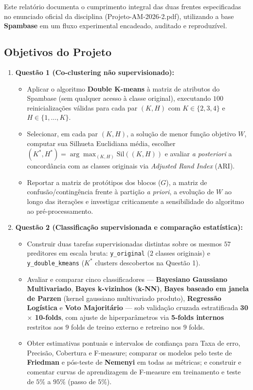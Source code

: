 \documentclass[a4paper,11pt]{article}
\begin{document}
Este relatório documenta o cumprimento integral das duas frentes especificadas no enunciado oficial da disciplina (Projeto-AM-2026-2.pdf), utilizando a base \textbf{Spambase} em um fluxo experimental encadeado, auditado e reproduzível.

\subsection{Objetivos do Projeto}\label{sec:1-1-objetivos-do-projeto}


\begin{enumerate}[leftmargin=1.5em, itemsep=0.25em, topsep=0.25em]
  \item \textbf{Questão 1 (Co-clustering não supervisionado):}
\begin{itemize}[leftmargin=1.5em, itemsep=0.25em, topsep=0.25em]
  \item Aplicar o algoritmo \textbf{Double K-means} à matriz de atributos do Spambase (sem qualquer acesso à classe original), executando $100$ reinicializações válidas para cada par $(K, H)$ com $K \in \{2, 3, 4\}$ e $H \in \{1, \ldots, K\}$.
  \item Selecionar, em cada par $(K, H)$, a solução de menor função objetivo $W$, computar sua Silhueta Euclidiana média, escolher $(K^*, H^*) = \arg\max_{(K,H)} \text{Sil}((K,H))$ e avaliar \textit{a posteriori} a concordância com as classes originais via \textit{Adjusted Rand Index} (ARI).
  \item Reportar a matriz de protótipos dos blocos ($G$), a matriz de confusão/contingência frente à partição \textit{a priori}, a evolução de $W$ ao longo das iterações e investigar criticamente a sensibilidade do algoritmo ao pré-processamento.
\end{itemize}
  \item \textbf{Questão 2 (Classificação supervisionada e comparação estatística):}
\begin{itemize}[leftmargin=1.5em, itemsep=0.25em, topsep=0.25em]
  \item Construir duas tarefas supervisionadas distintas sobre os mesmos $57$ preditores em escala bruta: \texttt{y\_\allowbreak original} ($2$ classes originais) e \texttt{y\_\allowbreak double\_\allowbreak kmeans} ($K^*$ clusters descobertos na Questão 1).
  \item Avaliar e comparar cinco classificadores --- \textbf{Bayesiano Gaussiano Multivariado}, \textbf{Bayes k-vizinhos (k-NN)}, \textbf{Bayes baseado em janela de Parzen} (kernel gaussiano multivariado produto), \textbf{Regressão Logística} e \textbf{Voto Majoritário} --- sob validação cruzada estratificada \textbf{30 $\times$ 10-folds}, com ajuste de hiperparâmetros via \textbf{5-folds internos} restritos aos $9$ folds de treino externo e retreino nos $9$ folds.
  \item Obter estimativas pontuais e intervalos de confiança para Taxa de erro, Precisão, Cobertura e F-measure; comparar os modelos pelo teste de \textbf{Friedman} e pós-teste de \textbf{Nemenyi} em todas as métricas; e construir e comentar curvas de aprendizagem de F-measure em treinamento e teste de $5\%$ a $95\%$ (passo de $5\%$).
\end{itemize}
\end{enumerate}
\end{document}
